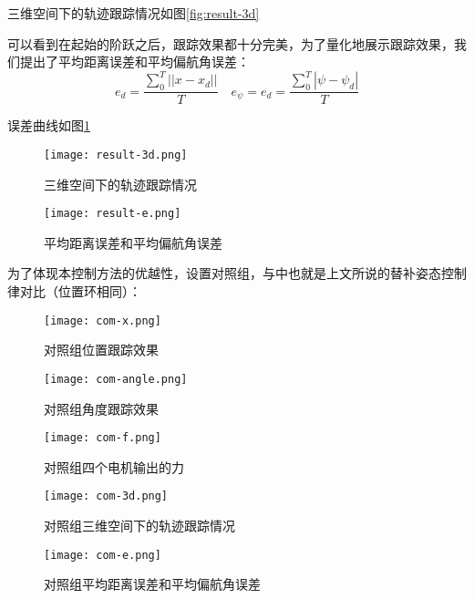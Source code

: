   \pagebreak
  
  三维空间下的轨迹跟踪情况如图\ref{fig:result-3d}

  可以看到在起始的阶跃之后，跟踪效果都十分完美，为了量化地展示跟踪效果，我们提出了平均距离误差和平均偏航角误差：
  $$e_d=\frac{\sum_0^{T}||x-x_d||}{T} \quad e_\psi=e_d=\frac{\sum_0^{T}|\psi-\psi_d|}{T}$$

  误差曲线如图\ref{fig:result-e}
 

  \begin{figure}[h]
    \centering
       \begin{minipage}[c]{0.45\textwidth}
        \centering
        \texttt{[image: result-3d.png]}
        \caption{三维空间下的轨迹跟踪情况}
        \label{fig:result-3d}
     \end{minipage}%
       \begin{minipage}[c]{0.45\textwidth}
        \centering
        \texttt{[image: result-e.png]}
        \caption{平均距离误差和平均偏航角误差}
        \label{fig:result-e}
     \end{minipage}
   \end{figure}

   为了体现本控制方法的优越性，设置对照组，与\cite{Lee2010}中也就是上文所说的替补姿态控制律对比（位置环相同）：
   
  \begin{figure}[h]
    \centering
    \begin{minipage}[c]{0.33\textwidth}
      \centering
      \texttt{[image: com-x.png]}
      \caption{对照组位置跟踪效果}
      \label{fig:com-x}
    \end{minipage} \hfill
    \begin{minipage}[c]{0.33\textwidth}
      \centering
      \texttt{[image: com-angle.png]}
      \caption{对照组角度跟踪效果}
      \label{fig:com-angle}
    \end{minipage}\hfill
      \begin{minipage}[c]{0.33\textwidth}
        \centering
        \texttt{[image: com-f.png]}
        \caption{对照组四个电机输出的力}
        \label{fig:com-f}
    \end{minipage}
    \end{figure}

    \begin{figure}[h]
      \centering
         \begin{minipage}[c]{0.45\textwidth}
          \centering
          \texttt{[image: com-3d.png]}
          \caption{对照组三维空间下的轨迹跟踪情况}
          \label{fig:com-3d}
       \end{minipage}%
         \begin{minipage}[c]{0.45\textwidth}
          \centering
          \texttt{[image: com-e.png]}
          \caption{对照组平均距离误差和平均偏航角误差}
          \label{fig:com-e}
       \end{minipage}
     \end{figure}

